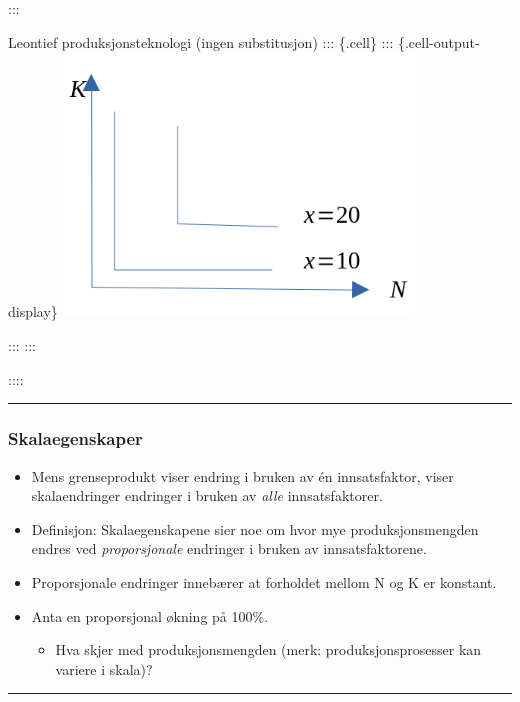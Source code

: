 \documentclass[
  letterpaper,
  DIV=11,
  numbers=noendperiod]{scrartcl}
\providecommand{\tightlist}{%
  \setlength{\itemsep}{0pt}\setlength{\parskip}{0pt}}\usepackage{longtable,booktabs,array}
\begin{document}
:::

Leontief produksjonsteknologi (ingen substitusjon) ::: \{.cell\} :::
\{.cell-output-display\}
\includegraphics[width=0.7\textwidth,height=\textheight]{drawio/lensub.png}

::: :::

::::

\begin{center}\rule{0.5\linewidth}{0.5pt}\end{center}

\subsubsection{Skalaegenskaper}\label{skalaegenskaper}

\begin{itemize}
\tightlist
\item
  Mens grenseprodukt viser endring i bruken av én innsatsfaktor, viser
  skalaendringer endringer i bruken av \emph{alle} innsatsfaktorer.
\item
  Definisjon: Skalaegenskapene sier noe om hvor mye produksjonsmengden
  endres ved \emph{proporsjonale} endringer i bruken av
  innsatsfaktorene.
\item
  Proporsjonale endringer innebærer at forholdet mellom N og K er
  konstant.
\item
  Anta en proporsjonal økning på 100\%.

  \begin{itemize}
  \tightlist
  \item
    Hva skjer med produksjonsmengden (merk: produksjonsprosesser kan
    variere i skala)?
  \end{itemize}
\end{itemize}

\begin{center}\rule{0.5\linewidth}{0.5pt}\end{center}
\end{document}
